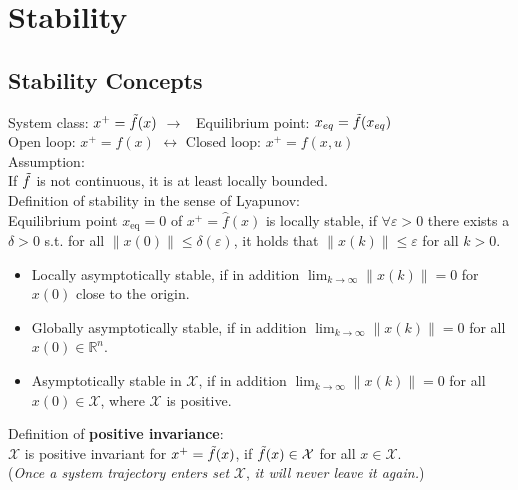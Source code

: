 \documentclass[english]{latex4ei/latex4ei_sheet}
\begin{document}
\section{Stability}
\begin{sectionbox}

\subsection{Stability Concepts}
System class: $x^{+}=\Tilde{f}(x)$ \quad $\rightarrow$ \ Equilibrium point: $x_{eq}=\Tilde{f}(x_{eq})$\\
Open loop: $x^{+}=f(x)$ \; $\longleftrightarrow$ \; Closed loop: $x^{+}=f(x,u)$\vspace{0.1cm}
\\
Assumption:\\
If $\Tilde{f}$ is not continuous, it is at least locally bounded.\vspace{0.1cm}
\\
Definition of stability in the sense of Lyapunov:\\
Equilibrium point $x_{\mathrm{eq}}=0$ of $x^{+}=\hat{f}(x)$ is locally stable, if $\forall\varepsilon>0$ there exists a $\delta>0$ s.t. for all $\|x(0)\| \leq \delta(\varepsilon)$, it holds that $\|x(k)\| \leq \varepsilon$ for all $k>0$.
\begin{itemize}
    \item Locally asymptotically stable, if in addition $\lim _{k \rightarrow \infty}\|x(k)\|=0$ for $x(0)$ close to the origin.
    \item Globally asymptotically stable, if in addition $\lim _{k \rightarrow \infty}\|x(k)\|=0$ for all $x(0) \in \mathbb{R}^{n}$.
    \item Asymptotically stable in $\mathcal{X}$, if in addition $\lim _{k \rightarrow \infty}\|x(k)\|=0$ for all $x(0) \in \mathcal{X}$, where $\mathcal{X}$ is positive.
\end{itemize}\vspace{0.2cm}

Definition of \textbf{positive invariance}:\\
$\mathcal{X}$ is positive invariant for $x^{+}=\Tilde{f}(x)$, if $\Tilde{f}(x)\in\mathcal{X}$ for all $x\in\mathcal{X}$.\\
(\textit{Once a system trajectory enters set} $\mathcal{X}$, \textit{it will never leave it again.})\\


\end{sectionbox}
\end{document}
